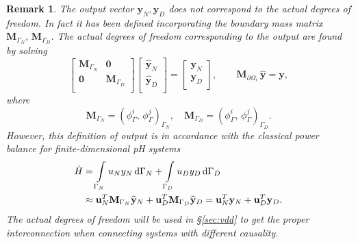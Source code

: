 \documentclass{ifacconf}
\newtheorem{remark}{Remark}
\newcommand{\secref}[1]{\S\ref{#1}}
\begin{document}
\begin{remark}
The output vector $\mathbf{y}_N, \mathbf{y}_D$ does not correspond to the actual degrees of freedom. In fact it has been defined incorporating the boundary mass matrix $\mathbf{M}_{\Gamma_N}, \, \mathbf{M}_{\Gamma_D}$. The actual degrees of freedom corresponding to the output are found by solving
\begin{equation}
\label{eq:y_dof}
\begin{bmatrix}
\mathbf{M}_{\Gamma_N} & \mathbf{0} \\
\mathbf{0} & \mathbf{M}_{\Gamma_D} \\
\end{bmatrix}
\begin{bmatrix}
\widehat{\mathbf{y}}_N \\
\widehat{\mathbf{y}}_D \\
\end{bmatrix} = 
\begin{bmatrix}
\mathbf{y}_N \\
\mathbf{y}_D \\
\end{bmatrix}, \qquad
\mathbf{M}_{\partial\Omega_r} \,  \widehat{\mathbf{y}} = \mathbf{y},
\end{equation}
where 
\begin{equation}\label{eq:Mgamma}
	\mathbf{M}_{\Gamma_N} = ({\phi}_{\Gamma}^{i},\, {\phi}_{\Gamma}^{j})_{\Gamma_N}, \quad \mathbf{M}_{\Gamma_D} = ({\phi}_{\Gamma}^{i},\, {\phi}_{\Gamma}^{j})_{\Gamma_D}.
\end{equation}
However, this definition of output is in accordance with the classical power balance for finite-dimensional pH systems
\begin{align*}
\dot{H} &= \int_{\Gamma_N} u_N y_N \d{\Gamma_N} + \int_{\Gamma_D} u_D y_D \d{\Gamma_D} \\
&\approx \mathbf{u}_N^T \mathbf{M}_{\Gamma_N} \widehat{\mathbf{y}}_N + \mathbf{u}_D^T \mathbf{M}_{\Gamma_D} \widehat{\mathbf{y}}_D = \mathbf{u}_N^T \mathbf{y}_N + \mathbf{u}_D^T \mathbf{y}_D.
\end{align*}
The actual degrees of freedom will be used in \secref{sec:vdd} to get the proper interconnection when connecting systems with different causality.
\end{remark}
\end{document}

